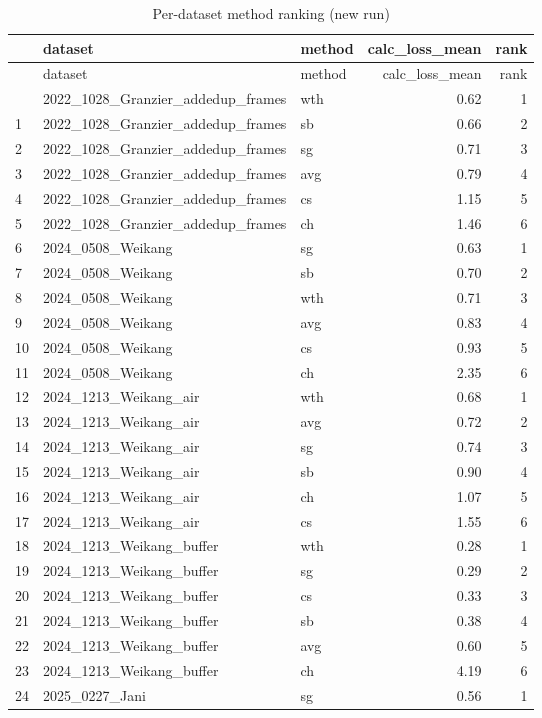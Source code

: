\documentclass{article}
\begin{document}
\begin{longtable}{lllrr}
\caption{Per-dataset method ranking (new run)}\\
\toprule
 & dataset & method & calc_loss_mean & rank \\
\midrule
\endfirsthead
\toprule
 & dataset & method & calc_loss_mean & rank \\
\midrule
\endhead
\bottomrule
\endfoot
0 & 2022_1028_Granzier_addedup_frames & wth & 0.62 & 1 \\
1 & 2022_1028_Granzier_addedup_frames & sb & 0.66 & 2 \\
2 & 2022_1028_Granzier_addedup_frames & sg & 0.71 & 3 \\
3 & 2022_1028_Granzier_addedup_frames & avg & 0.79 & 4 \\
4 & 2022_1028_Granzier_addedup_frames & cs & 1.15 & 5 \\
5 & 2022_1028_Granzier_addedup_frames & ch & 1.46 & 6 \\
6 & 2024_0508_Weikang & sg & 0.63 & 1 \\
7 & 2024_0508_Weikang & sb & 0.70 & 2 \\
8 & 2024_0508_Weikang & wth & 0.71 & 3 \\
9 & 2024_0508_Weikang & avg & 0.83 & 4 \\
10 & 2024_0508_Weikang & cs & 0.93 & 5 \\
11 & 2024_0508_Weikang & ch & 2.35 & 6 \\
12 & 2024_1213_Weikang_air & wth & 0.68 & 1 \\
13 & 2024_1213_Weikang_air & avg & 0.72 & 2 \\
14 & 2024_1213_Weikang_air & sg & 0.74 & 3 \\
15 & 2024_1213_Weikang_air & sb & 0.90 & 4 \\
16 & 2024_1213_Weikang_air & ch & 1.07 & 5 \\
17 & 2024_1213_Weikang_air & cs & 1.55 & 6 \\
18 & 2024_1213_Weikang_buffer & wth & 0.28 & 1 \\
19 & 2024_1213_Weikang_buffer & sg & 0.29 & 2 \\
20 & 2024_1213_Weikang_buffer & cs & 0.33 & 3 \\
21 & 2024_1213_Weikang_buffer & sb & 0.38 & 4 \\
22 & 2024_1213_Weikang_buffer & avg & 0.60 & 5 \\
23 & 2024_1213_Weikang_buffer & ch & 4.19 & 6 \\
24 & 2025_0227_Jani & sg & 0.56 & 1 \\

\end{longtable}
\end{document}
